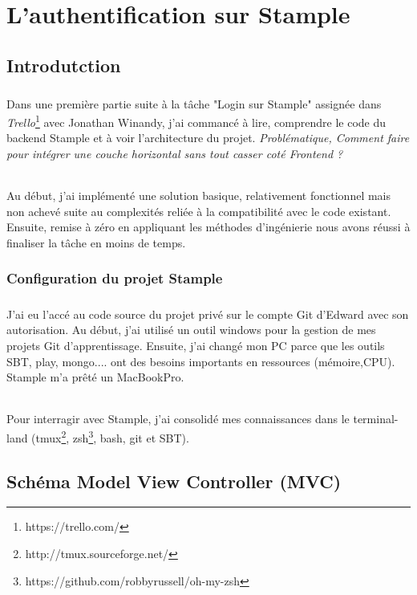 \chapter{L'authentification sur Stample}
\section*{}
\section{Introdutction}
\paragraph{}
Dans une première partie suite à la tâche "Login sur Stample" assignée dans \textit{Trello}\footnote{https://trello.com/} avec Jonathan Winandy, j'ai commancé à lire, comprendre le code du backend Stample et à voir l'architecture du projet. 
\newline
\textit{Problématique, Comment faire pour intégrer une couche horizontal sans tout casser coté Frontend ?}
\subparagraph{}
Au début, j'ai implémenté une solution basique, relativement fonctionnel mais non achevé suite au complexités reliée à la compatibilité avec le code existant.
Ensuite, remise à zéro en appliquant les méthodes d'ingénierie nous avons réussi à finaliser la tâche en moins de temps.
\subsection{Configuration du projet Stample}
\paragraph{}
J'ai eu l'accé au code source du projet privé sur le compte Git d'Edward avec son autorisation.
Au début, j'ai utilisé un outil windows pour la gestion de mes projets Git d'apprentissage.
Ensuite, j'ai changé mon PC parce que les outils SBT, play, mongo.... ont des besoins importants en ressources (mémoire,CPU). Stample m'a prêté un MacBookPro. 
\subparagraph{}
Pour interragir avec Stample, j'ai consolidé mes connaissances dans le terminal-land (tmux\footnote{http://tmux.sourceforge.net/}, zsh\footnote{https://github.com/robbyrussell/oh-my-zsh}, bash, git et SBT).
\section{Schéma Model View Controller (MVC)}
